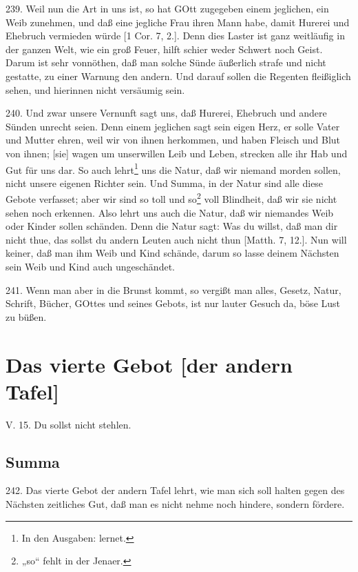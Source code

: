 239. Weil nun die Art in uns ist, so hat GOtt zugegeben einem jeglichen, ein Weib zunehmen, und daß eine jegliche Frau ihren Mann habe, damit Hurerei und Ehebruch vermieden würde [1 Cor. 7, 2.]. Denn dies Laster ist ganz weitläufig in der ganzen Welt, wie ein groß Feuer, hilft schier weder Schwert noch Geist. Darum ist sehr vonnöthen, daß man solche Sünde äußerlich strafe und nicht gestatte, zu einer Warnung den andern. Und darauf sollen die Regenten fleißiglich sehen, und hierinnen nicht versäumig sein.

240. Und zwar unsere Vernunft sagt uns, daß Hurerei, Ehebruch und andere Sünden unrecht seien. Denn einem jeglichen sagt sein eigen Herz, er solle Vater und Mutter ehren, weil wir von ihnen herkommen, und haben Fleisch und Blut von ihnen; [sie] wagen um unserwillen Leib und Leben, strecken alle ihr Hab und Gut für uns dar. So auch lehrt\footnote{In den Ausgaben: lernet.} uns die Natur, daß wir niemand morden sollen, nicht unsere eigenen Richter sein. Und Summa, in der Natur sind alle diese Gebote verfasset; aber wir sind so toll und so\footnote{„so“ fehlt in der Jenaer.} voll Blindheit, daß wir sie nicht sehen noch erkennen. Also lehrt uns auch die Natur, daß wir niemandes Weib oder Kinder sollen schänden. Denn die Natur sagt: Was du willst, daß man dir nicht thue, das sollst du andern Leuten auch nicht thun [Matth. 7, 12.]. Nun will keiner, daß man ihm Weib und Kind schände, darum so lasse deinem Nächsten sein Weib und Kind auch ungeschändet.

241. Wenn man aber in die Brunst kommt, so vergißt man alles, Gesetz, Natur, Schrift, Bücher, GOttes und seines Gebots, ist nur lauter Gesuch da, böse Lust zu büßen.

\section{Das vierte Gebot [der andern Tafel]}

\begin{schriftzitat}
V. 15. Du sollst nicht stehlen.
\end{schriftzitat}

\subsection{Summa}

242. Das vierte Gebot der andern Tafel lehrt, wie man sich soll halten gegen des Nächsten zeitliches Gut, daß man es nicht nehme noch hindere, sondern fördere.

